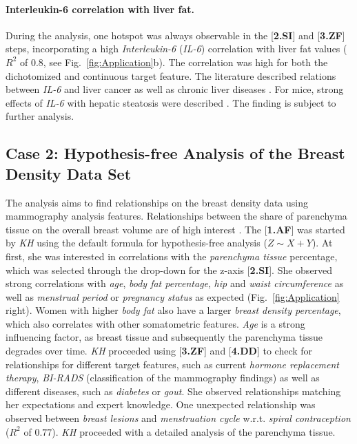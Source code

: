 \documentclass[journal]{style/vgtc} 			          %
\begin{document}
\paragraph{Interleukin-6 correlation with liver fat.}
During the analysis, one hotspot was always observable in the [\textbf{2.SI}] and [\textbf{3.ZF}] steps, incorporating a high \emph{Interleukin-6} (\emph{IL-6}) correlation with liver fat values ($R^2$ of $0.8$, see Fig.~\ref{fig:Application}b).
The correlation was high for both the dichotomized and continuous target feature.
The literature described relations between \emph{IL-6} and liver cancer \cite{He2013} as well as chronic liver diseases \cite{Streetz2003}.
For mice, strong effects of \emph{IL-6} with hepatic steatosis were described \cite{Hong2004}.
The finding is subject to further analysis.
\subsection{Case 2: Hypothesis-free Analysis of the Breast Density Data Set}
The analysis aims to find relationships on the breast density data using mammography analysis features.
Relationships between the share of parenchyma tissue on the overall breast volume are of high interest \cite{Mccormack2006}.
The [\textbf{1.AF}] was started by \emph{KH} using the default formula for hypothesis-free analysis ($Z \sim X + Y$).
At first, she was interested in correlations with the \emph{parenchyma tissue} percentage, which was selected through the drop-down for the z-axis [\textbf{2.SI}].
She observed strong correlations with \emph{age}, \emph{body fat percentage}, \emph{hip} and \emph{waist circumference} as well as \emph{menstrual period} or \emph{pregnancy status} as expected (Fig.~\ref{fig:Application} right).
Women with higher \emph{body fat} also have a larger \emph{breast density percentage}, which also correlates with other somatometric features.
\emph{Age} is a strong influencing factor, as breast tissue and subsequently the parenchyma tissue degrades over time.
\emph{KH} proceeded using [\textbf{3.ZF}] and [\textbf{4.DD}] to check for relationships for different target features, such as current \emph{hormone replacement therapy}, \emph{BI-RADS} (classification of the mammography findings) as well as different diseases, such as \emph{diabetes} or \emph{gout}.
She observed relationships matching her expectations and expert knowledge.
One unexpected relationship was observed between \emph{breast lesions} and \emph{menstruation cycle} w.r.t. \emph{spiral contraception} ($R^2$ of $0.77$).
\emph{KH} proceeded with a detailed analysis of the parenchyma tissue.
\end{document}
